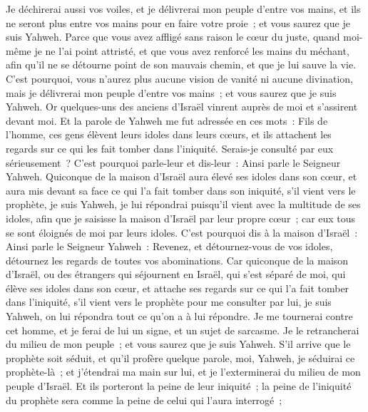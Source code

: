\begin{multicols}{2}
Je déchirerai aussi vos voiles, et je délivrerai mon peuple d'entre vos mains, et ils ne seront plus entre vos mains pour en faire votre proie~; et vous saurez que je suis Yahweh.
Parce que vous avez affligé sans raison le cœur du juste, quand moi-même je ne l'ai point attristé, et que vous avez renforcé les mains du méchant, afin qu'il ne se détourne point de son mauvais chemin, et que je lui sauve la vie.
C'est pourquoi, vous n'aurez plus aucune vision de vanité ni aucune divination, mais je délivrerai mon peuple d'entre vos mains~; et vous saurez que je suis Yahweh.
\VerseOne{}Or quelques-uns des anciens d'Israël vinrent auprès de moi et s'assirent devant moi.
Et la parole de Yahweh me fut adressée en ces mots~:
Fils de l'homme, ces gens élèvent leurs idoles dans leurs cœurs, et ils attachent les regards sur ce qui les fait tomber dans l'iniquité. Serais-je consulté par eux sérieusement~?
C'est pourquoi parle-leur et dis-leur~: Ainsi parle le Seigneur Yahweh. Quiconque de la maison d'Israël aura élevé ses idoles dans son cœur, et aura mis devant sa face ce qui l'a fait tomber dans son iniquité, s'il vient vers le prophète, je suis Yahweh, je lui répondrai puisqu'il vient avec la multitude de ses idoles,
afin que je saisisse la maison d'Israël par leur propre cœur~; car eux tous se sont éloignés de moi par leurs idoles.
C'est pourquoi dis à la maison d'Israël~: Ainsi parle le Seigneur Yahweh~: Revenez, et détournez-vous de vos idoles, détournez les regards de toutes vos abominations.
Car quiconque de la maison d'Israël, ou des étrangers qui séjournent en Israël, qui s'est séparé de moi, qui élève ses idoles dans son cœur, et attache ses regards sur ce qui l'a fait tomber dans l'iniquité, s'il vient vers le prophète pour me consulter par lui, je suis Yahweh, on lui répondra tout ce qu'on a à lui répondre.
Je me tournerai contre cet homme, et je ferai de lui un signe, et un sujet de sarcasme. Je le retrancherai du milieu de mon peuple~; et vous saurez que je suis Yahweh.
S'il arrive que le prophète soit séduit, et qu'il profère quelque parole, moi, Yahweh, je séduirai ce prophète-là~; et j'étendrai ma main sur lui, et je l'exterminerai du milieu de mon peuple d'Israël.
Et ils porteront la peine de leur iniquité~; la peine de l'iniquité du prophète sera comme la peine de celui qui l'aura interrogé~;

\end{multicols}
